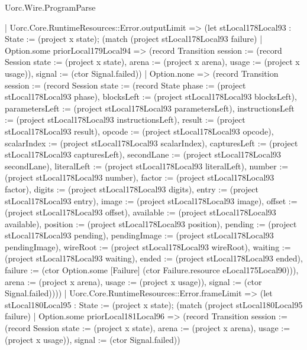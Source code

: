 \begin{lexlean}{Uorc.Wire.ProgramParse}
\begin{semanticmodule}
{      | Uorc.Core.RuntimeResources::Error.outputLimit => (let stLocal178Local93 : State := (project x state); (match (project stLocal178Local93 failure)
        | Option.some priorLocal179Local94 => (record Transition {session := (record Session {state := (project x state), arena := (project x arena), usage := (project x usage)}), signal := (ctor Signal.failed)})
        | Option.none => (record Transition {session := (record Session {state := (record State {phase := (project stLocal178Local93 phase), blocksLeft := (project stLocal178Local93 blocksLeft), parametersLeft := (project stLocal178Local93 parametersLeft), instructionsLeft := (project stLocal178Local93 instructionsLeft), result := (project stLocal178Local93 result), opcode := (project stLocal178Local93 opcode), scalarIndex := (project stLocal178Local93 scalarIndex), capturesLeft := (project stLocal178Local93 capturesLeft), secondLane := (project stLocal178Local93 secondLane), literalLeft := (project stLocal178Local93 literalLeft), number := (project stLocal178Local93 number), factor := (project stLocal178Local93 factor), digits := (project stLocal178Local93 digits), entry := (project stLocal178Local93 entry), image := (project stLocal178Local93 image), offset := (project stLocal178Local93 offset), available := (project stLocal178Local93 available), position := (project stLocal178Local93 position), pending := (project stLocal178Local93 pending), pendingImage := (project stLocal178Local93 pendingImage), wireRoot := (project stLocal178Local93 wireRoot), waiting := (project stLocal178Local93 waiting), ended := (project stLocal178Local93 ended), failure := (ctor Option.some [Failure] (ctor Failure.resource eLocal175Local90))}), arena := (project x arena), usage := (project x usage)}), signal := (ctor Signal.failed)})))
      | Uorc.Core.RuntimeResources::Error.frameLimit => (let stLocal180Local95 : State := (project x state); (match (project stLocal180Local95 failure)
        | Option.some priorLocal181Local96 => (record Transition {session := (record Session {state := (project x state), arena := (project x arena), usage := (project x usage)}), signal := (ctor Signal.failed)})
}
\end{semanticmodule}
\end{lexlean}
